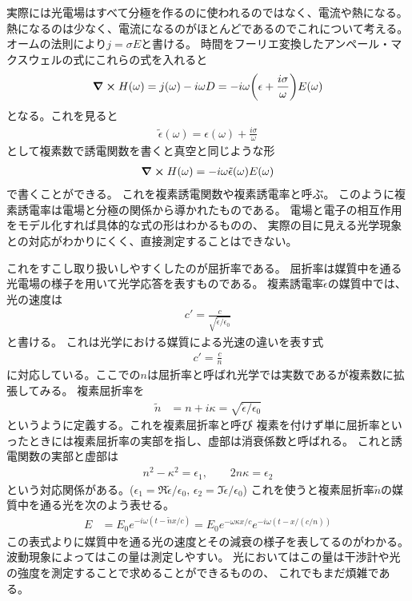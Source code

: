 \documentclass[11pt,dvipdfmx,a4paper]{jsarticle}
\begin{document}
実際には光電場はすべて分極を作るのに使われるのではなく、電流や熱になる。
熱になるのは少なく、電流になるのがほとんどであるのでこれについて考える。
オームの法則により\(j=\sigma E\)と書ける。
時間をフーリエ変換したアンペール・マクスウェルの式にこれらの式を入れると
\begin{align}
    \curl H(\omega) = j(\omega) - i\omega D = -i\omega \qty(\epsilon+\frac{i\sigma}{\omega}) E(\omega)
\end{align}
となる。これを見ると
\begin{align}
    \tilde{\epsilon}(\omega) = \epsilon(\omega) + \frac{i\sigma}{\omega}
\end{align}
として複素数で誘電関数を書くと真空と同じような形
\begin{align}
    \curl H(\omega) = -i\omega \tilde{\epsilon}(\omega) E(\omega)
\end{align}
で書くことができる。
これを複素誘電関数や複素誘電率と呼ぶ。
このように複素誘電率は電場と分極の関係から導かれたものである。
電場と電子の相互作用をモデル化すれば具体的な式の形はわかるものの、
実際の目に見える光学現象との対応がわかりにくく、直接測定することはできない。

これをすこし取り扱いしやすくしたのが屈折率である。
屈折率は媒質中を通る光電場の様子を用いて光学応答を表すものである。
複素誘電率\(\tilde{\epsilon}\)の媒質中では、光の速度は
\begin{align}
    c' = \frac{c}{\sqrt{\tilde{\epsilon}/\epsilon_0}}
\end{align}
と書ける。
これは光学における媒質による光速の違いを表す式
\begin{align}
    c' = \frac{c}{n}
\end{align}
に対応している。ここでの\(n\)は屈折率と呼ばれ光学では実数であるが複素数に拡張してみる。
複素屈折率を
\begin{align}
    \tilde{n} &= n + i\kappa = \sqrt{\tilde{\epsilon}/\epsilon_0}
\end{align}
というように定義する。これを複素屈折率と呼び
複素を付けず単に屈折率といったときには複素屈折率の実部を指し、虚部は消衰係数と呼ばれる。
これと誘電関数の実部と虚部は
\begin{align}
    n^2-\kappa^2 = \epsilon_1,\qquad 2n\kappa = \epsilon_2
\end{align}
という対応関係がある。(\(\epsilon_1=\Re{\tilde{\epsilon}/\epsilon_0},\,\epsilon_2=\Im{\tilde{\epsilon}/\epsilon_0}\))
これを使うと複素屈折率\(\tilde{n}\)の媒質中を通る光を次のよう表せる。
\begin{align}
    E &= E_0 e^{-i\omega (t - \tilde{n}x/c)} = E_0 e^{-\omega \kappa x / c}e^{-i\omega (t - x/(c/n))}
\end{align}
この表式よりに媒質中を通る光の速度とその減衰の様子を表してるのがわかる。
波動現象によってはこの量は測定しやすい。
光においてはこの量は干渉計や光の強度を測定することで求めることができるものの、
これでもまだ煩雑である。
\end{document}
